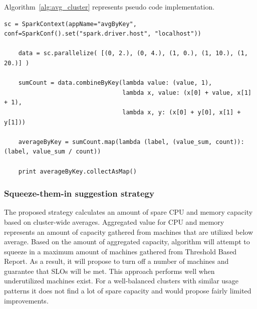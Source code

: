 \documentclass[]{final_report}
\begin{document}
Algorithm~\ref{alg:avg_cluster} represents pseudo code implementation.

\begin{algorithm}[h]
\caption{}
\label{alg:avg_cluster}
 \algrenewcommand{}
 \algrenewcommand{}
\end{algorithm}

\begin{minipage}{\linewidth}
\begin{lstlisting}[label={avg_cluster},caption={Example code for averages in Apache Spark},frame=single] 
    sc = SparkContext(appName="avgByKey", conf=SparkConf().set("spark.driver.host", "localhost"))

    data = sc.parallelize( [(0, 2.), (0, 4.), (1, 0.), (1, 10.), (1, 20.)] )

    sumCount = data.combineByKey(lambda value: (value, 1),
                                 lambda x, value: (x[0] + value, x[1] + 1),
                                 lambda x, y: (x[0] + y[0], x[1] + y[1]))

    averageByKey = sumCount.map(lambda (label, (value_sum, count)): (label, value_sum / count))

    print averageByKey.collectAsMap()
\end{lstlisting}
\end{minipage}

\subsubsection{Squeeze-them-in suggestion strategy}

The proposed strategy calculates an amount of spare CPU and memory capacity based on cluster-wide averages. Aggregated value for CPU and memory represents an amount of capacity gathered from machines that are utilized below average. Based on the amount of aggregated capacity, algorithm will attempt to squeeze in a maximum amount of machines gathered from Threshold Based Report. As a result, it will propose to turn off a number of machines and guarantee that SLOs will be met.
This approach performs well when underutilized machines exist. For a well-balanced clusters with similar usage patterns it does not find a lot of spare capacity and would propose fairly limited improvements. 
\end{document}
